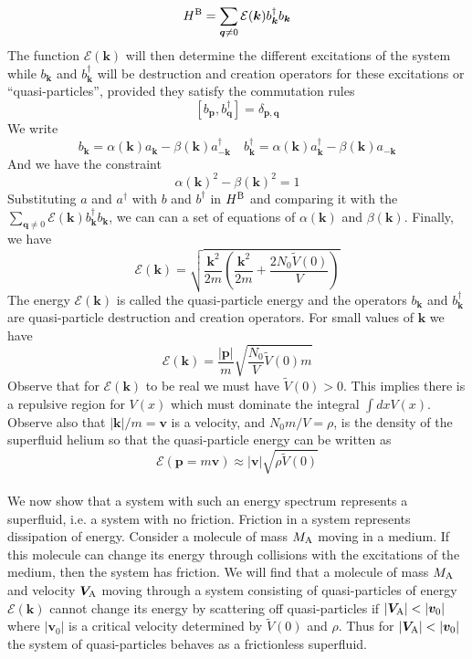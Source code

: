 \[H^{\rm B} = \sum_{\bm{q} \neq 0} \mathcal{E}(\bm{k})b^{\dagger}_{\bm{k}} b_{\bm{k}} \]
The function $\mathcal{E}(\bm{k})$  will then determine the different excitations of the system while $b_{\bm{k}}$ and $b^{\dagger}_{\bm{k}}$ will be destruction and creation operators for these excitations or ``quasi-particles'', provided they satisfy the commutation rules
\[[b_{\bm{p}},b_{\bm{q}}^{\dagger}] = \delta_{\bm{p},\bm{q}}\]
We write
\[b_{\bm{k}} = \alpha(\bm{k})a_{\bm{k}} - \beta(\bm{k})a^{\dagger}_{-\bm{k}} \quad b^{\dagger}_{\bm{k}} = \alpha(\bm{k})a^{\dagger}_{\bm{k}} - \beta(\bm{k})a_{-\bm{k}} \]
And we have the constraint
\[\alpha(\bm{k})^2 - \beta(\bm{k})^2 = 1\]
Substituting $a$ and $a^{\dagger}$ with $b$ and $b^{\dagger}$ in $H^{\rm B}$ and comparing it with the $\sum_{\bm{q} \neq 0} \mathcal{E}(\bm{k})b^{\dagger}_{\bm{k}} b_{\bm{k}}$, we can can a set of equations of $\alpha(\bm{k})$ and $\beta(\bm{k})$. Finally, we have
\[\mathcal{E}(\bm{k}) = \sqrt{\frac{\bm{k}^2}{2m} \left(\frac{\bm{k}^2}{2m} + \frac{2N_0\tilde{V}(0)}{V} \right) }\]
The energy $\mathcal{E}(\bm{k})$ is called the quasi-particle energy and the operators $b_{\bm{k}}$ and $b^{\dagger}_{\bm{k}}$ are quasi-particle destruction and creation operators. 
For small values of $\bm{k}$ we have
\[\mathcal{E}(\bm{k}) = \frac{|\bm{p}|}{m} \sqrt{\frac{N_0}{V}\tilde{V}(0)m}\]
Observe that for $\mathcal{E}(\bm{k})$ to be real we must have $\tilde{V}(0) > 0$. This implies there is a repulsive region for $V(x)$ which must dominate the integral $\int dx V(x)$. Observe also that $|\bm{k}|/m = \bm{v}$ is a velocity, and $N_0m/V = \rho$, is the density of the superfluid helium so that the quasi-particle energy can be written as 
\[\mathcal{E}(\bm{p} = m\bm{v}) \approx |\bm{v}|\sqrt{\rho\tilde{V}(0)}\]
\\
We now show that a system with such an energy spectrum represents a superfluid, i.e. a system with no friction.
Friction in a system represents dissipation of energy.
Consider a molecule of mass $M_{\rm A}$ moving in a medium. If this molecule can change its energy through collisions with the excitations of the medium, then the system has friction. 
We will find that a molecule of mass $M_{\rm A}$ and velocity $\bm{V}_{\rm A}$ moving through a system consisting of quasi-particles of energy $\mathcal{E}(\bm{k})$ cannot change its energy by scattering off quasi-particles if $|\bm{V}_{\rm A}| < |\bm{v}_0|$ where $|\bm{v}_0|$ is a critical velocity determined by $\tilde{V}(0)$ and $\rho$. 
Thus for $|\bm{V}_{\rm A}| < |\bm{v}_0|$ the system of quasi-particles behaves as a frictionless superfluid.
